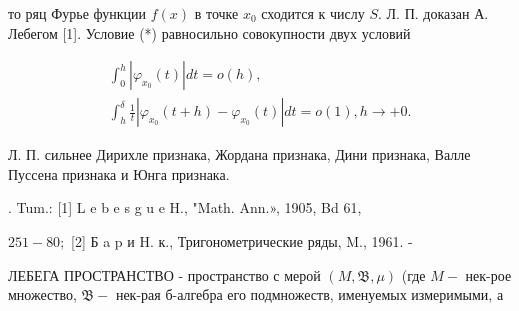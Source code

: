 \documentclass[10pt]{article}
\begin{document}
то ряц Фурье функции $f(x)$ в точке $x_{0}$ сходится к числу $S$. Л. П. доказан А. Лебегом [1]. Условие (*) равносильно совокупности двух условий



\[

\begin{gathered}

\int_{0}^{h}\left|\varphi_{x_{0}}(t)\right| d t=o(h), \\

\int_{h}^{\delta} \frac{1}{t}\left|\varphi_{x_{0}}(t+h)-\varphi_{x_{0}}(t)\right| d t=o(1), h \rightarrow+0 .

\end{gathered}

\]



Л. П. сильнее Дирихле признака, Жордана признака, Дини признака, Валле Пуссена признака и Юнга признака.



. Tum.: [1] L e b e s g u e H., "Math. Ann.», 1905, Bd 61,

$251-80 ;$ [2] Б a p и H. к., Тригонометрические ряды, M., 1961. -



ЛЕБЕГА ПРОСТРАНСТВО - пространство с мерой $(M, \mathfrak{B}, \mu)$ (где $M-$ нек-рое множество, $\mathfrak{B}-$ нек-рая б-алгебра его подмножеств, именуемых измеримыми, а
\end{document}
